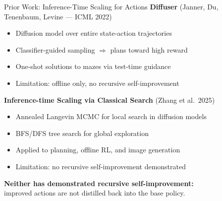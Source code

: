 \documentclass[aspectratio=169,11pt]{beamer}
\begin{document}
\begin{frame}{Prior Work: Inference-Time Scaling for Actions}
\textbf{Diffuser} {\small (Janner, Du, Tenenbaum, Levine --- ICML 2022)}
\begin{itemize}\setlength\itemsep{3pt}
  \item Diffusion model over entire state-action trajectories
  \item Classifier-guided sampling $\Rightarrow$ plans toward high reward
  \item One-shot solutions to mazes via test-time guidance
  \item \textcolor{redaccent}{Limitation:} offline only, no recursive self-improvement
\end{itemize}

\pause
\medskip
\textbf{Inference-time Scaling via Classical Search} {\small (Zhang et al.\ 2025)}
\begin{itemize}\setlength\itemsep{3pt}
  \item Annealed Langevin MCMC for local search in diffusion models
  \item BFS/DFS tree search for global exploration
  \item Applied to planning, offline RL, and image generation
  \item \textcolor{redaccent}{Limitation:} no recursive self-improvement demonstrated
\end{itemize}

\pause
\medskip
\textbf{Neither has demonstrated recursive self-improvement:} \\
improved actions are not distilled back into the base policy.
\end{frame}
\end{document}
